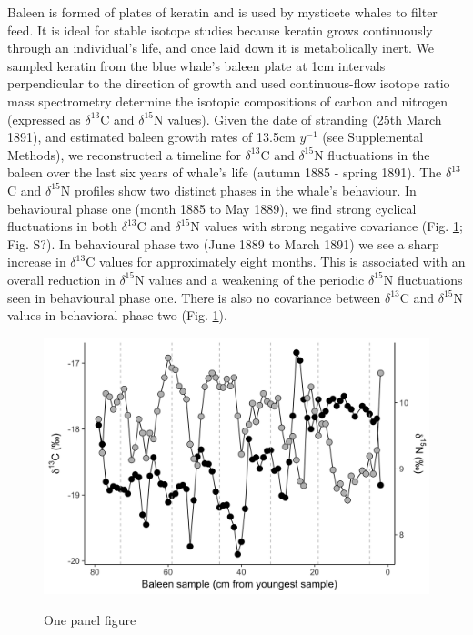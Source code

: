 \documentclass[a4paper,12pt]{article}
\begin{document}
Baleen is formed of plates of keratin and is used by mysticete whales to filter feed. 
It is ideal for stable isotope studies because keratin grows continuously through an individual's life, and once laid down it is metabolically inert\cite{best1996stable}. 
We sampled keratin from the blue whale's baleen plate at 1cm intervals perpendicular to the direction of growth and used continuous-flow isotope ratio mass spectrometry determine the isotopic compositions of carbon and nitrogen (expressed as $\delta^{13}$C and $\delta^{15}$N values). 
Given the date of stranding (25th March 1891), and estimated baleen growth rates of 13.5cm $y^{-1}$ (see Supplemental Methods), we reconstructed a timeline for $\delta^{13}$C and $\delta^{15}$N fluctuations in the baleen over the last six years of whale's life (autumn 1885 - spring 1891). The $\delta^{13}$C and $\delta^{15}$N profiles show two distinct phases in the whale's behaviour. 
In behavioural phase one (month 1885 to May 1889), we find strong cyclical fluctuations in both $\delta^{13}$C and $\delta^{15}$N values with strong negative covariance (Fig. \ref{fig1}; Fig. S?). 
In behavioural phase two (June 1889 to March 1891) we see a sharp increase in $\delta^{13}$C values for approximately eight months.
This is associated with an overall reduction in $\delta^{15}$N values and a weakening of the periodic $\delta^{15}$N fluctuations seen in behavioural phase one. 
There is also no covariance between $\delta^{13}$C and $\delta^{15}$N values in behavioral phase two (Fig. \ref{fig1}). 

\begin{figure}
  \centering
  \includegraphics[width = \linewidth]{figures/Figure-1a-raw-dC-dN-data.png}
  \label{fig1}
  \caption{One panel figure}
\end{figure}
\end{document}
